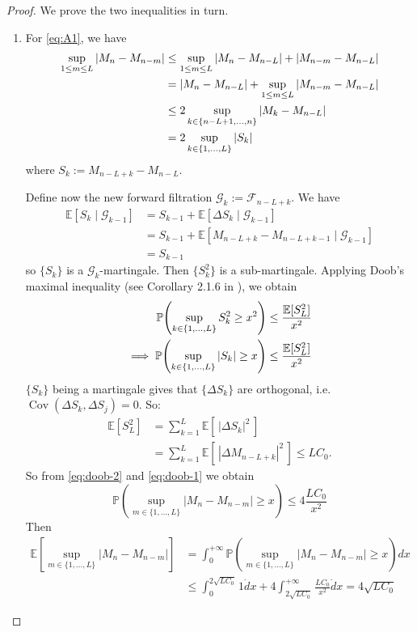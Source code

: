 \begin{proof}
    We prove the two inequalities in turn.
    \begin{enumerate}[label=(\roman*)]
        \item For \eqref{eq:A1}, we have
		\begin{align}
			\sup_{1 \le m \le L} |M_n - M_{n-m}| 
			&\le \sup_{1 \le m \le L} |M_n - M_{n-L}| + |M_{n-m} - M_{n-L}|\\
			&= |M_n - M_{n-L}| + \sup_{1 \le m \le L} |M_{n-m} - M_{n-L}|\notag\\
			&\le 2 \sup_{k \in \{n-L+1, \dots, n\}} |M_k - M_{n-L}|\notag\\
			&= 2 \sup_{k \in \{1, \dots, L\}} |S_k|\label{eq:doob-2}
		\end{align}
		where \(S_k := M_{n-L+k} - M_{n-L}.\) 
		
		Define now the new forward filtration \(\mathcal{G}_k := \mathcal{F}_{n-L+k}\). 
		We have 
		\begin{align*}
			\mathbb{E}[S_k \mid \mathcal{G}_{k-1}] 
			&= S_{k-1} + \mathbb{E}[\Delta S_k\mid \mathcal{G}_{k-1}]\\
			&= S_{k-1} + \mathbb{E}[M_{n-L+k} - M_{n-L+k-1} \mid \mathcal{G}_{k-1}]\\
			&= S_{k-1}
		\end{align*}
		so \(\{S_k\}\) is a \(\mathcal{G}_k\)-martingale. Then \(\{S_k^2\}\) is a sub-martingale. Applying Doob's maximal inequality (see Corollary 2.1.6 in \cite{marc-yor}), we obtain
		\begin{align}
			\mathbb{P}\!\left( \sup_{k \in \{1,\dots,L\}} S_k^2 \ge x^2 \right)
			&\le \frac{\mathbb{E}[S_L^2]}{x^2}\notag\\
			\implies \mathbb{P}\!\left( \sup_{k \in \{1,\dots,L\}} |S_k| \ge x \right)
			&\le \frac{\mathbb{E}[S_L^2]}{x^2}\label{eq:doob-1}
		\end{align}
		\(\{S_k\}\) being a martingale gives that \(\{\Delta S_k\}\) are orthogonal,  
		i.e. \(\operatorname{Cov}(\Delta S_k, \Delta S_j)=0\). So:
		\begin{align*}
			\mathbb{E}[S_L^2]
			&= \sum_{k=1}^L \mathbb{E}[\,|\Delta S_k|^2\,]\\
			&= \sum_{k=1}^L \mathbb{E}\!\left[\,|\Delta M_{n-L+k}|^2\,\right]\le L C_0.		
		\end{align*}	
		So from \eqref{eq:doob-2} and \eqref{eq:doob-1} we obtain 
		\[
		\mathbb{P}\!\left( \sup_{m \in \{1,\dots,L\}} |M_n - M_{n-m}| \ge x \right)
		\le 4\frac{LC_0}{x^2}
		\]	
		Then
		\begin{align*}
			\mathbb{E}\left[\sup_{m \in \{1,\dots,L\}} |M_n - M_{n-m}|\right] &= \int_{0}^{+\infty}\mathbb{P}\!\left( \sup_{m \in \{1,\dots,L\}} |M_n - M_{n-m}| \ge x \right) dx\\
			&\leq \int_{0}^{2\sqrt{LC_0}}1 \dot dx + 4\int_{2\sqrt{LC_0}}^{+\infty}\frac{LC_0}{x^2} \dot dx = 4\sqrt{LC_0}
		\end{align*}
		

\end{enumerate}
\end{proof}
